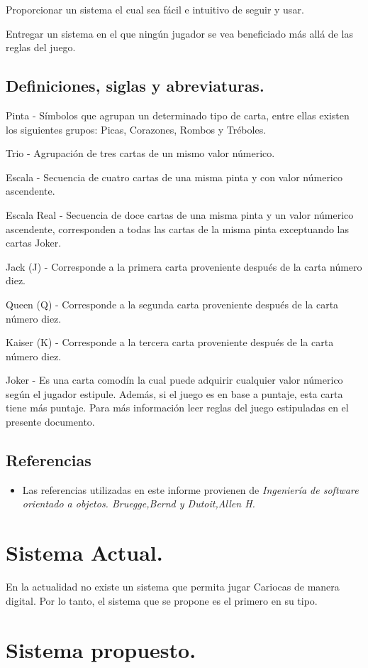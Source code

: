 \documentclass[60pt]{article}
\begin{document}
Proporcionar un sistema el cual sea fácil e intuitivo de seguir y usar.

Entregar un sistema en el que ningún jugador se vea beneficiado más allá de las reglas del juego.
\subsection{Definiciones, siglas y abreviaturas.}\label{cap:definiciones}
Pinta - Símbolos que agrupan un determinado tipo de carta, entre ellas existen los siguientes grupos: Picas, Corazones, Rombos y Tréboles.

Trio - Agrupación de tres cartas de un mismo valor númerico.

Escala - Secuencia de cuatro cartas de una misma pinta y con valor númerico ascendente.

Escala Real - Secuencia de doce cartas de una misma pinta y un valor númerico ascendente, corresponden a todas las cartas de la misma pinta exceptuando las cartas Joker.

Jack (J) - Corresponde a la primera carta proveniente después de la carta número diez.

Queen (Q) - Corresponde a la segunda carta proveniente después de la carta número diez.

Kaiser (K) - Corresponde a la tercera carta proveniente después de la carta número diez.

Joker - Es una carta comodín la cual puede adquirir cualquier valor númerico según el jugador estipule. Además, si el juego es en base a puntaje, esta carta tiene más puntaje. Para más información leer reglas del juego estipuladas en el presente documento.
\subsection*{Referencias}
\begin{itemize}
    \item Las referencias utilizadas en este informe provienen de \textit{Ingeniería de software orientado a objetos. Bruegge,Bernd y Dutoit,Allen H.} \cite{oop}
\end{itemize}
\section{Sistema Actual.}\label{cap:sistemaActual}
En la actualidad no existe un sistema que permita jugar Cariocas de manera digital. Por lo tanto, el sistema que se propone es el primero en su tipo.
\section{Sistema propuesto.}\label{cap:sistema}
\end{document}

